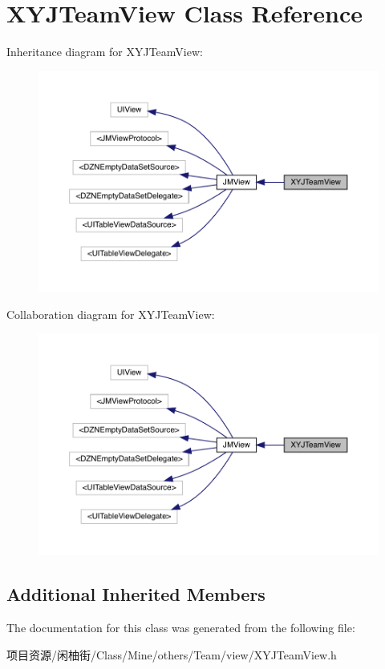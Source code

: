 \hypertarget{interface_x_y_j_team_view}{}\section{X\+Y\+J\+Team\+View Class Reference}
\label{interface_x_y_j_team_view}


Inheritance diagram for X\+Y\+J\+Team\+View\+:\nopagebreak
\begin{figure}[H]
\begin{center}
\leavevmode
\includegraphics[width=350pt]{interface_x_y_j_team_view__inherit__graph}
\end{center}
\end{figure}


Collaboration diagram for X\+Y\+J\+Team\+View\+:\nopagebreak
\begin{figure}[H]
\begin{center}
\leavevmode
\includegraphics[width=350pt]{interface_x_y_j_team_view__coll__graph}
\end{center}
\end{figure}
\subsection*{Additional Inherited Members}


The documentation for this class was generated from the following file\+:\begin{DoxyCompactItemize}
\item 
项目资源/闲柚街/\+Class/\+Mine/others/\+Team/view/X\+Y\+J\+Team\+View.\+h\end{DoxyCompactItemize}
